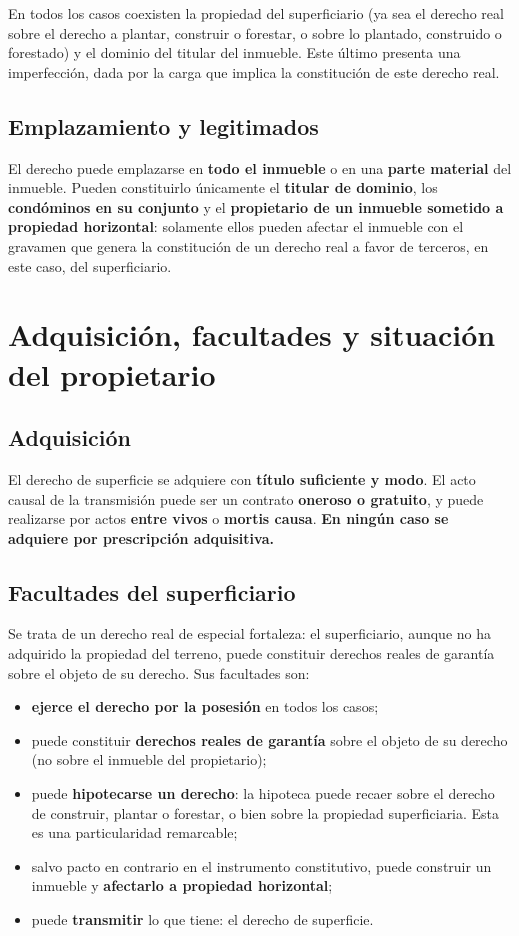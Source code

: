 \documentclass[12pt,oneside]{book}
\begin{document}
En todos los casos coexisten la propiedad del superficiario (ya sea el derecho real sobre el derecho a plantar, construir o forestar, o sobre lo plantado, construido o forestado) y el dominio del titular del inmueble. Este último presenta una imperfección, dada por la carga que implica la constitución de este derecho real.

\subsection{Emplazamiento y legitimados}

El derecho puede emplazarse en \textbf{todo el inmueble} o en una \textbf{parte material} del inmueble. Pueden constituirlo únicamente el \textbf{titular de dominio}, los \textbf{condóminos en su conjunto} y el \textbf{propietario de un inmueble sometido a propiedad horizontal}: solamente ellos pueden afectar el inmueble con el gravamen que genera la constitución de un derecho real a favor de terceros, en este caso, del superficiario.

\section{Adquisición, facultades y situación del propietario}

\subsection{Adquisición}

El derecho de superficie se adquiere con \textbf{título suficiente y modo}. El acto causal de la transmisión puede ser un contrato \textbf{oneroso o gratuito}, y puede realizarse por actos \textbf{entre vivos} o \textbf{mortis causa}. \textbf{En ningún caso se adquiere por prescripción adquisitiva.}

\subsection{Facultades del superficiario}

Se trata de un derecho real de especial fortaleza: el superficiario, aunque no ha adquirido la propiedad del terreno, puede constituir derechos reales de garantía sobre el objeto de su derecho. Sus facultades son:

\begin{itemize}
    \item \textbf{ejerce el derecho por la posesión} en todos los casos;
    \item puede constituir \textbf{derechos reales de garantía} sobre el objeto de su derecho (no sobre el inmueble del propietario);
    \item puede \textbf{hipotecarse un derecho}: la hipoteca puede recaer sobre el derecho de construir, plantar o forestar, o bien sobre la propiedad superficiaria. Esta es una particularidad remarcable;
    \item salvo pacto en contrario en el instrumento constitutivo, puede construir un inmueble y \textbf{afectarlo a propiedad horizontal};
    \item puede \textbf{transmitir} lo que tiene: el derecho de superficie.
\end{itemize}
\end{document}
